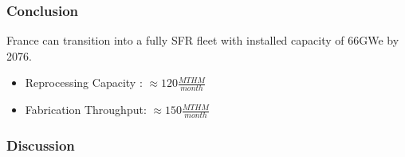 \begin{frame}
	\frametitle{Conclusion}
	France can transition into
	a fully SFR fleet with installed capacity of 66GWe by 2076.
	\begin{itemize}
		\item Reprocessing Capacity : $\approx 120 \frac{MTHM}{month}$
		\item Fabrication Throughput: $\approx 150 \frac{MTHM}{month}$
	\end{itemize}
\end{frame}

\begin{frame}
    \frametitle{Discussion}
    \begin{table}[h]
\centering
    \begin{adjustbox}{max totalsize={1.1\textwidth}{.8\textheight}, center}
                \begin{tabularx}{\textwidth}{lbb}
                    \hline 
                    

\end{tabularx}
\end{adjustbox}
\end{table}
\end{frame}
